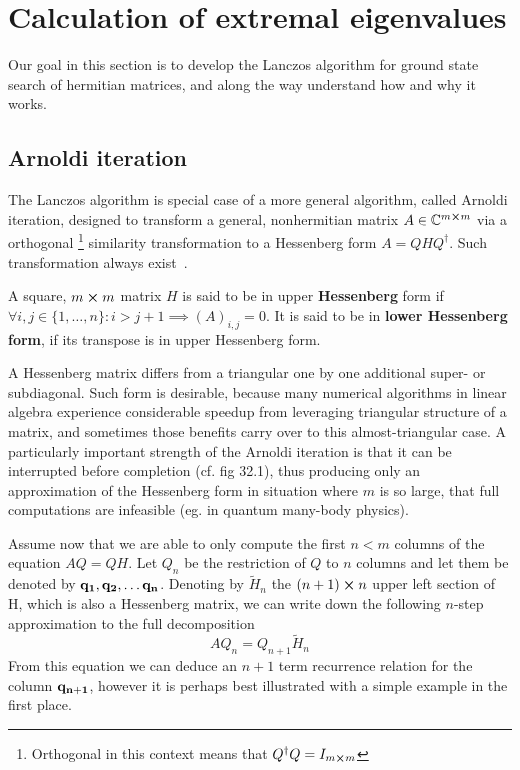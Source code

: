 \section{Calculation of extremal eigenvalues}
Our goal in this section is to develop the Lanczos algorithm for ground state search of hermitian matrices, and along
the way understand how and why it works.

\subsection{Arnoldi iteration}
The Lanczos algorithm is special case of a more general algorithm, called Arnoldi iteration, designed to transform
a general, nonhermitian matrix \(A\in \mathbb{C}^{m\cross m} \) via a orthogonal
\footnote{Orthogonal in this context means that \(Q^{\dagger}Q = I_{m \cross m}\)} similarity transformation to a Hessenberg form \(A = QHQ^{\dagger}\).
Such transformation always exist~\autocite{Garcia2017}.


\begin{definition}
    A square, \(m \cross m\) matrix \(H\) is said to be in upper \textbf{Hessenberg} form if
    \(\forall i,j\in \{1,\ldots,n\}: i > j+1 \implies (A)_{i,j}=0 \).
    It is said to be in \textbf{lower Hessenberg form}, if its transpose is in upper Hessenberg form.
\end{definition}
A Hessenberg matrix differs from a triangular one by one additional super- or subdiagonal.
Such form is desirable, because many numerical algorithms in linear algebra experience considerable speedup
from leveraging triangular structure of a matrix, and sometimes those benefits carry over to this almost-triangular
case. A particularly important strength of the Arnoldi iteration is that it can be interrupted before completion (cf. fig 32.1),
thus producing only an approximation of the Hessenberg form in situation where \(m\) is so large, that
full computations are infeasible (eg. in quantum many-body physics).

Assume now that we are able to only compute the first \(n < m\) columns of the equation \(AQ=QH\).
Let \(Q_n\) be the restriction of \(Q\) to \(n\) columns and let them be denoted by \(\vectorbold{q_1},\vectorbold{q_2}, \ldots 
\vectorbold{ q_n}\).
Denoting by \(\tilde{H}_n\) the \((n+1)\cross n\) upper left section of H, which is also a Hessenberg matrix, we can 
write down the following \(n\)-step approximation to the full decomposition
\begin{equation}
	AQ_{n}=Q_{n+1}\tilde{H}_{n}
	\label{eq:krylov_n_approx}
\end{equation}
From this equation we can deduce an \(n+1\) term recurrence relation for the column \(\vectorbold{q_{n+1}}\), however
it is perhaps best illustrated with a simple example in the first place.

